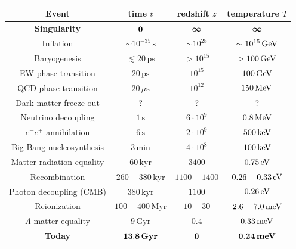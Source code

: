 \begin{center}
  \begin{tabular}{cccc}
    \hline
    \hspace{5em} Event \hspace{5em} & \hspace{1em} time $ t $ \hspace{1em} & \hspace{1em} redshift $ z $ \hspace{1em} & \hspace{1em} temperature $ T $ \hspace{1em} \\
    \hline
    \textbf{Singularity} & $ \mathbf{0} $ & $ \boldsymbol{\infty} $ & $ \boldsymbol{\infty} $ \\ [1ex]
    Inflation & $ \sim 10^{-35} \,\text{s} $ & $ \sim 10^{28} $ & $ \sim 10^{15} \,\mathrm{GeV} $ \\ [1ex]
    Baryogenesis & $ \lesssim 20 \,\text{ps} $ & $ > 10^{15} $ & $ > 100 \,\mathrm{GeV} $ \\ [1ex]
    EW phase transition & $ 20 \,\text{ps} $ & $ 10^{15} $ & $ 100 \,\mathrm{GeV} $ \\ [1ex]
    QCD phase transition & $ 20 \,\mu\text{s} $ & $ 10^{12} $ & $ 150 \,\mathrm{MeV} $ \\ [1ex]
    Dark matter freeze-out & ? & ? & ? \\ [1ex]
    Neutrino decoupling & $ 1 \,\text{s} $ & $ 6 \cdot 10^9 $ & $ 0.8 \,\mathrm{MeV} $ \\ [1ex]
    $ e^- e^+ $ annihilation & $ 6 \,\text{s} $ & $ 2 \cdot 10^9 $ & $ 500 \,\mathrm{keV} $ \\ [1ex]
    Big Bang nucleosynthesis & $ 3 \,\text{min} $ & $ 4 \cdot 10^8 $ & $ 100 \,\mathrm{keV} $ \\ [1ex]
    Matter-radiation equality & $ 60 \,\text{kyr} $ & $ 3400 $ & $ 0.75 \,\mathrm{eV} $ \\ [1ex]
    Recombination & $ 260 - 380 \,\text{kyr} $ & $ 1100 - 1400 $ & $ 0.26 - 0.33 \,\mathrm{eV} $ \\ [1ex]
    Photon decoupling (CMB) & $ 380 \,\text{kyr} $ & $ 1100 $ & $ 0.26 \,\mathrm{eV} $ \\ [1ex]
    Reionization & $ 100 - 400 \,\text{Myr} $ & $ 10 - 30 $ & $ 2.6 - 7.0 \,\mathrm{meV} $ \\ [1ex]
    $ \Lambda $-matter equality & $ 9 \,\text{Gyr} $ & $ 0.4 $ & $ 0.33 \,\mathrm{meV} $ \\ [1ex]
    \textbf{Today} & $ \mathbf{13.8} \, \text{\textbf{Gyr}} $ & $ \mathbf{0} $ & $ \mathbf{0.24} \, \text{\textbf{meV}} $ \\
    \hline
  \end{tabular}
\end{center}

